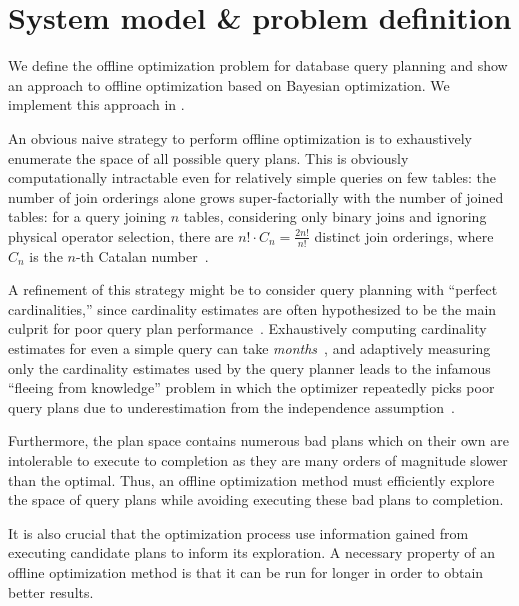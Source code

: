 \section{System model \& problem definition}

We define the offline optimization problem for database query planning and show an approach to offline optimization based on Bayesian optimization. We implement this approach in \sysname.


 An obvious naive strategy to perform offline optimization is to exhaustively enumerate the space of all possible query plans. This is obviously computationally intractable even for relatively simple queries on few tables: the number of join orderings alone grows super-factorially with the number of joined tables: for a query joining $n$ tables, considering only binary joins and ignoring physical operator selection, there are $n! \cdot C_n = \frac{2n!}{n!}$ distinct join orderings, where $C_n$ is the $n$-th Catalan number~\cite{joe_complexity}.

A refinement of this strategy might be to consider query planning with ``perfect cardinalities,'' since cardinality estimates are often hypothesized to be the main culprit for poor query plan performance~\cite{howgood}. Exhaustively computing cardinality estimates for even a simple query can take \emph{months}~\cite{flowloss}, and adaptively measuring only the cardinality estimates used by the query planner leads to the infamous ``fleeing from knowledge'' problem in which the optimizer repeatedly picks poor query plans due to underestimation from the independence assumption~\cite{fleeing_from_knowledge}.

Furthermore, the plan space contains numerous bad plans which on their own are intolerable to execute to completion as they are many orders of magnitude slower than the optimal. Thus, an offline optimization method must efficiently explore the space of query plans while avoiding executing these bad plans to completion.

It is also crucial that the optimization process use information gained from executing candidate plans to inform its exploration. A necessary property of an offline optimization method is that it can be run for longer in order to obtain better results.


